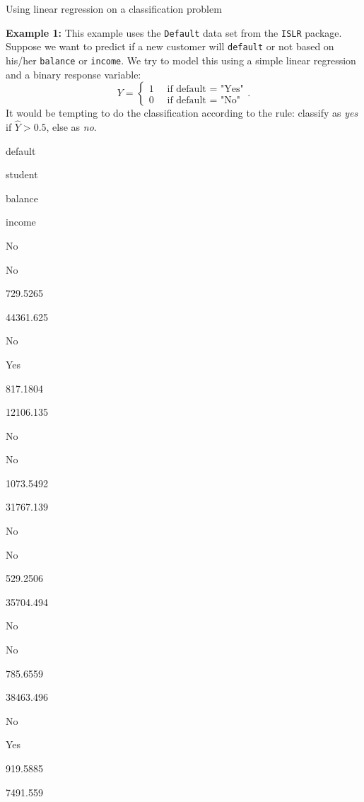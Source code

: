 \documentclass[10pt,ignorenonframetext,]{beamer}
\begin{document}
\begin{frame}[fragile]

\begin{block}{Using linear regression on a classification problem}

\textbf{Example 1:} This example uses the \texttt{Default} data set from
the \texttt{ISLR} package. Suppose we want to predict if a new customer
will \texttt{default} or not based on his/her \texttt{balance} or
\texttt{income}. We try to model this using a simple linear regression
and a binary response variable:
\[Y = \begin{cases} 1 \quad \text{ if default = "Yes"} \\ 0 \quad \text{ if default = "No"} \end{cases}.\]
It would be tempting to do the classification according to the rule:
classify as \emph{yes} if \(\hat{Y}>0.5\), else as \emph{no}.

\end{block}

\end{frame}

\begin{frame}

default

student

balance

income

No

No

729.5265

44361.625

No

Yes

817.1804

12106.135

No

No

1073.5492

31767.139

No

No

529.2506

35704.494

No

No

785.6559

38463.496

No

Yes

919.5885

7491.559

\end{frame}
\end{document}
